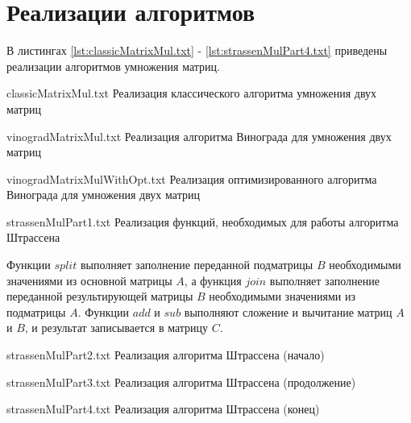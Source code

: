 \section{Реализации алгоритмов}

В листингах \ref{lst:classicMatrixMul.txt} - \ref{lst:strassenMulPart4.txt} приведены реализации алгоритмов умножения матриц.

{classicMatrixMul.txt} %
{Реализация классического алгоритма умножения двух матриц} %

\clearpage

{vinogradMatrixMul.txt} %
{Реализация алгоритма Винограда для умножения двух матриц} %

\clearpage

{vinogradMatrixMulWithOpt.txt} %
{Реализация оптимизированного алгоритма Винограда для умножения двух матриц} %

\clearpage

{strassenMulPart1.txt} %
{Реализация функций, необходимых для работы алгоритма Штрассена} %

Функции $split$ выполняет заполнение переданной подматрицы $B$ необходимыми значениями из основной матрицы $A$, а функция $join$ выполняет заполнение переданной результирующей матрицы $B$ необходимыми значениями из подматрицы $A$. Функции $add$ и $sub$ выполняют сложение и вычитание матриц $A$ и $B$, и результат записывается в матрицу $C$.

{strassenMulPart2.txt} %
{Реализация алгоритма Штрассена (начало)} %

\clearpage

{strassenMulPart3.txt} %
{Реализация алгоритма Штрассена (продолжение)} %

\clearpage

{strassenMulPart4.txt} %
{Реализация алгоритма Штрассена (конец)} %

